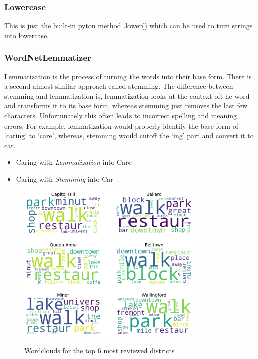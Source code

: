 \documentclass[journal]{IEEEtran}
\begin{document}
\subsubsection{Lowercase}
\noindent This is just the built-in pyton method .lower() which can be used to turn strings into lowercase.

\subsubsection{WordNetLemmatizer}
\noindent Lemmatization is the process of turning the words into their base form. There is a second almost similar approach called stemming. 
The difference between stemming and lemmatization is, lemmatization looks at the context oft he word and transforms it to its base form, whereas stemming just removes the last few characters. Unfortunately this often leads to incorrect spelling and meaning errors. For example, lemmatization would properly identify the base form of ‘caring‘ to ‘care’, whereas, stemming would cutoff the ‘ing’ part and convert it to car.
\begin{itemize}
\item Caring with \textit{Lemmatization} into Care
\item Caring with \textit{Stemming} into Car
\end{itemize}

\begin{figure}
  \begin{center}
  \includegraphics[width=3.5in]{photo/13_wordclouds.png}\\
  \caption{Wordclouds for the top 6 most reviewed districts}\label{wordclouds}
  \end{center}
\end{figure}
%
\end{document}
